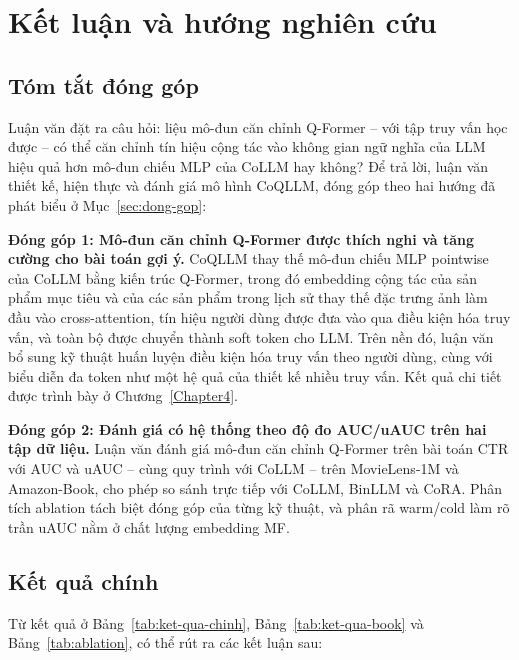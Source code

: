 \chapter{Kết luận và hướng nghiên cứu}
\label{Chapter5}

\section{Tóm tắt đóng góp}
\label{sec:tom-tat-dong-gop}

Luận văn đặt ra câu hỏi: liệu mô-đun căn chỉnh Q-Former -- với tập truy vấn học được -- có thể
căn chỉnh tín hiệu cộng tác vào không gian ngữ nghĩa của LLM hiệu quả
hơn mô-đun chiếu MLP của CoLLM hay không? Để trả lời, luận văn thiết kế, hiện thực và đánh
giá mô hình CoQLLM, đóng góp theo hai hướng đã phát biểu ở Mục~\ref{sec:dong-gop}:

\textbf{Đóng góp 1: Mô-đun căn chỉnh Q-Former được thích nghi và tăng cường cho bài toán gợi ý.}
CoQLLM thay thế mô-đun chiếu MLP pointwise của CoLLM bằng kiến trúc Q-Former, trong đó embedding
cộng tác của sản phẩm mục tiêu và của các sản phẩm trong lịch sử thay thế đặc trưng ảnh làm đầu
vào cross-attention, tín hiệu người dùng được đưa vào qua điều kiện hóa truy vấn, và toàn bộ
được chuyển thành soft token cho LLM. Trên nền đó, luận văn bổ sung kỹ thuật huấn luyện điều
kiện hóa truy vấn theo người dùng, cùng với biểu diễn đa token như một hệ quả của thiết kế
nhiều truy vấn. Kết quả chi tiết được trình bày ở Chương~\ref{Chapter4}.

\textbf{Đóng góp 2: Đánh giá có hệ thống theo độ đo AUC/uAUC trên hai tập dữ liệu.}
Luận văn đánh giá mô-đun căn chỉnh Q-Former trên bài toán CTR với AUC và uAUC -- cùng quy trình với
CoLLM -- trên MovieLens-1M và Amazon-Book, cho phép so sánh trực tiếp với CoLLM, BinLLM và
CoRA. Phân tích ablation tách biệt đóng góp của từng kỹ thuật, và phân rã warm/cold làm rõ
trần uAUC nằm ở chất lượng embedding MF.

\section{Kết quả chính}
\label{sec:ket-qua-dat-duoc}

Từ kết quả ở Bảng~\ref{tab:ket-qua-chinh}, Bảng~\ref{tab:ket-qua-book} và
Bảng~\ref{tab:ablation}, có thể rút ra các kết luận sau:

